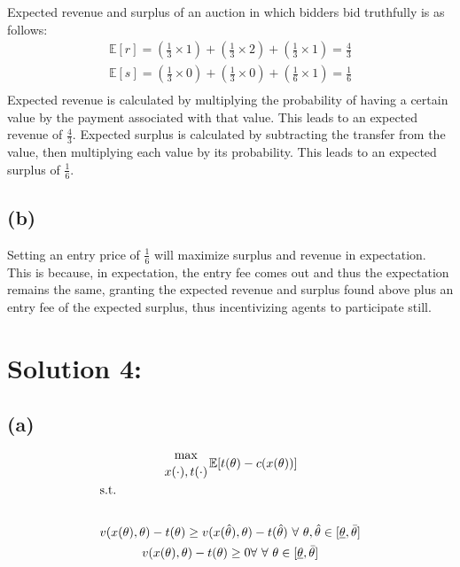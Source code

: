 \documentclass[10pt,a4paper]{article}
\begin{document}
    Expected revenue and surplus of an auction in which bidders bid truthfully is as follows:
    \begin{gather*}
      \mathbb{E}[r] = (\frac{1}{3}\times1) + (\frac{1}{3}\times2) +
      (\frac{1}{3}\times1) = \frac{4}{3} \\ 
      \mathbb{E}[s] = (\frac{1}{3}\times0) + (\frac{1}{3}\times0) +
      (\frac{1}{6}\times1) = \frac{1}{6} \\
    \end{gather*}
    Expected revenue is calculated by multiplying the probability of having a certain value by the payment associated with that value. This leads to an expected 
    revenue of $\frac{4}{3}$. Expected surplus is calculated by subtracting the transfer from the value, then multiplying each value by its probability. This 
    leads to an expected surplus of $\frac{1}{6}$.
  \subsection*{(b)}
    Setting an entry price of $\frac{1}{6}$ will maximize surplus and revenue in expectation. This is because, in expectation, the entry fee comes out and thus 
    the expectation remains the same, granting the expected revenue and surplus found above plus an entry fee of the expected surplus, thus incentivizing agents 
    to participate still.
\section*{Solution 4:}
  \subsection*{(a)}
    \begin{gather*}
      {\max\atop{x(\cdot),t(\cdot)}}\mathbb{E}[t(\theta) - c(x(\theta))] \\
      \shortintertext{s.t.} \\
      v(x(\theta),\theta) - t(\theta) \geq v(x(\hat{\theta}),\theta) - t(\hat{\theta}) \ \forall \ \theta,\hat{\theta}\in[\underline{\theta},\bar{\theta}] \\
      v(x(\theta),\theta) - t(\theta)\geq 0 \forall \ \forall \ \theta\in[\underline{\theta},\bar{\theta}] \\
    \end{gather*}
\end{document}

